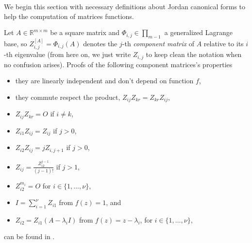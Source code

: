 
We begin this section with necessary definitions about Jordan canonical forms
to help the computation of matrices functions.

Let $A\in\mathbb{R}^{m\times m}$ be a square matrix and $\Phi_{i,j}
\in\prod_{m-1}$ a generalized Lagrange base, so $Z_{i,j}^{[A]} = \Phi_{i,j}(A)$
denotes the $j$-th \textit{component matrix} of $A$ relative to its $i$-th
eigenvalue (from here on, we just write $Z_{i,j}$ to keep clean the notation
when no confusion arises). Proofs of the following component matrices's
properties
\begin{itemize}
\item they are linearly independent and don't depend on function $f$,
\item they commute respect the product, $Z_{ij}Z_{kr}= Z_{kr}Z_{ij}$,
\item $Z_{ij}Z_{kr}=O$ if $i\neq k$,
\item $Z_{i1}Z_{ij}=Z_{ij}$ if $j > 0 $,
\item $Z_{i2}Z_{ij}=jZ_{i,j+1}$ if $j > 0 $,
\item $Z_{ij}=\frac{Z_{i2}^{j-1}}{(j-1)!}$ if $j > 1 $,
\item $Z_{i2}^{m_{i}}=O$ for $i\in\lbrace 1,\ldots,\nu\rbrace$,
\item $I = \sum_{i=1}^{\nu}{Z_{i1}}$ from $f(z)=1$, and
\item $Z_{i2} = Z_{i1}(A-\lambda_{i}I)$ from $f(z)=z-\lambda_{i}$, for
        $i\in\lbrace 1,\ldots,\nu\rbrace$,
\end{itemize}
can be found in \citep{BT1998, LT2002}.

